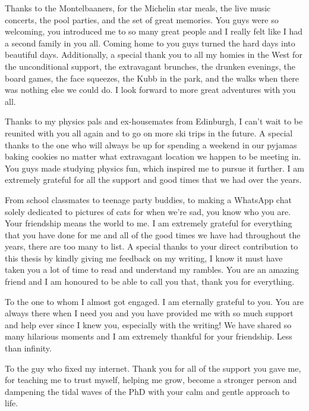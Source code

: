 Thanks to the Montelbaaners, for the Michelin star meals, the live music concerts, the pool parties, and the set of great memories. You guys were so welcoming, you introduced me to so many great people and I really felt like I had a second family in you all. Coming home to you guys turned the hard days into beautiful days. Additionally, a special thank you to all my homies in the West for the unconditional support, the extravagant brunches, the drunken evenings, the board games, the face squeezes, the Kubb in the park, and the walks when there was nothing else we could do. I look forward to more great adventures with you all.

Thanks to my physics pals and ex-housemates from Edinburgh, I can’t wait to be reunited with you all again and to go on more ski trips in the future. A special thanks to the one who will always be up for spending a weekend in our pyjamas baking cookies no matter what extravagant location we happen to be meeting in. You guys made studying physics fun, which inspired me to pursue it further. I am extremely grateful for all the support and good times that we had over the years.

From school classmates to teenage party buddies, to making a WhatsApp chat solely dedicated to pictures of cats for when we’re sad, you know who you are. Your friendship means the world to me. I am extremely grateful for everything that you have done for me and all of the good times we have had throughout the years, there are too many to list. A special thanks to your direct contribution to this thesis by kindly giving me feedback on my writing, I know it must have taken you a lot of time to read and understand my rambles. You are an amazing friend and I am honoured to be able to call you that, thank you for everything.

To the one to whom I almost got engaged. I am eternally grateful to you. You are always there when I need you and you have provided me with so much support and help ever since I knew you, especially with the writing! We have shared so many hilarious moments and I am extremely thankful for your friendship. Less than infinity.

To the guy who fixed my internet. Thank you for all of the support you gave me, for teaching me to trust myself, helping me grow, become a stronger person and dampening the tidal waves of the PhD with your calm and gentle approach to life.

